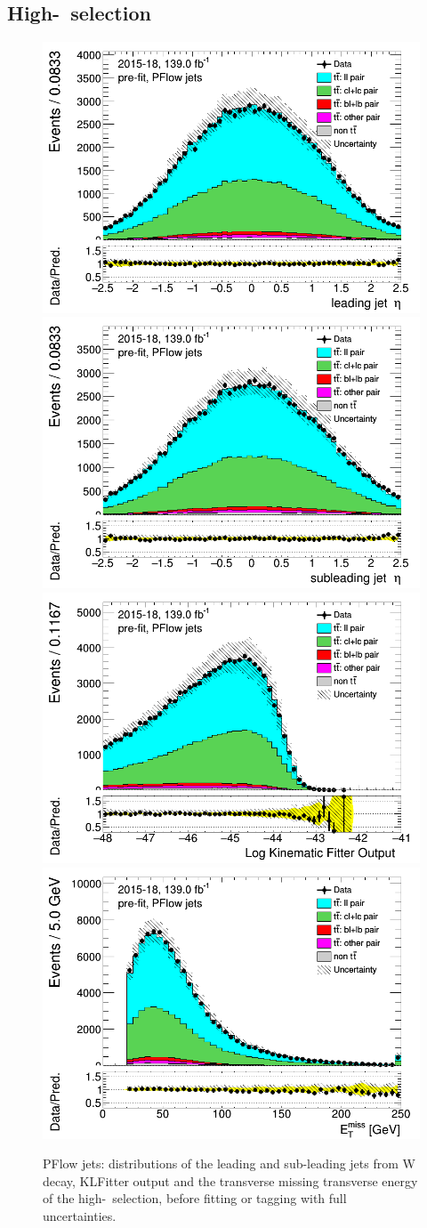 \documentclass[letterpaper,12pt]{article}
\begin{document}
\subsection{High-\pt\ selection}
\label{sec:appendix_highpT_selection}
\newpage	
\begin{figure}[H]
\includegraphics[width=.45\textwidth]{FTAG_plots/pretagNoRwnewonlyPFlowall/DataMC_h_J0_eta.png}
\includegraphics[width=.45\textwidth]{FTAG_plots/pretagNoRwnewonlyPFlowall/DataMC_h_J1_eta.png}\\
\includegraphics[width=.45\textwidth]{FTAG_plots/pretagNoRwnewonlyPFlowall/DataMC_h_LLR.png}
\includegraphics[width=.45\textwidth]{FTAG_plots/pretagNoRwnewonlyPFlowall/DataMC_h_MET.png}\\

\caption{PFlow jets: distributions of the leading and sub-leading jets 
from W decay, KLFitter output and the transverse missing transverse 
energy of the high-\pt\ selection, before fitting or tagging with 
full uncertainties.} \label{fig:highpT_jets_PFlow}
\end{figure}
\end{document}
